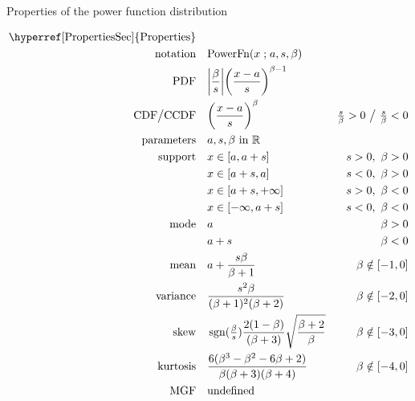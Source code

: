 

\begin{table*}[t!]
\caption[Power function distribution -- Properties]{Properties of the power function distribution}
\begin{align*}
\text{\hyperref[PropertiesSec]{Properties}}  \quad& \\
\text{notation}\quad &   \text{PowerFn}(x\given a,s,\beta) 
\\
\text{PDF}\quad &   \Left|\frac{\beta}{ s}\Right|\Left(\frac{x-a}{s} \Right)^{\beta -1}  \checked
\\
 \text{CDF}  \big/ \text{CCDF} \quad  &   \Left(\frac{x-a}{s} \Right)^{\beta } & \tfrac{s}{\beta}  >0 \ \big{/} \ \tfrac{s}{\beta}<0  \checked
\\
\text{parameters}\quad &   a, s, \beta \text{ in } \Real
\\
\text{support} \quad &    x \in [a,a+s] & s>0,\ \beta >0 \checked
 \\ 			 &  x\in[a+s,a] &s<0,\ \beta >0   \checked
 \\  			 &  x\in[a+s,+\infty]& s>0,\ \beta<0 \checked
 \\  			&  x\in[-\infty,a+s] & s<0,\ \beta<0  \checked
\\
\text{mode} \quad  & a & \beta >0 \checked
\\
& a+s & \beta <0  \checked
\\
\text{mean} \quad  &a+  \frac{s\beta}{\beta+1} &  \beta \notin [-1,0] \checked
\\
\text{variance} \quad  & \frac{ s^2 \beta }{ (\beta+1)^2 (\beta+2) } & \beta \notin [-2,0] \checked
\\
\text{skew} \quad  & \op{sgn}(\tfrac{\beta}{s}) \frac{2(1-\beta)}{(\beta+3)}  \sqrt{\frac{\beta+2}{\beta}}
& \beta \notin [-3,0] 
\\
\text{kurtosis} \quad  &  \frac{6(\beta^3-\beta ^2- 6 \beta +2)}{\beta(\beta +3)(\beta +4)} & \beta \notin [-4,0] \checked
\\
\text{MGF} \quad  &  \text{undefined}
\end{align*}
\end{table*}
